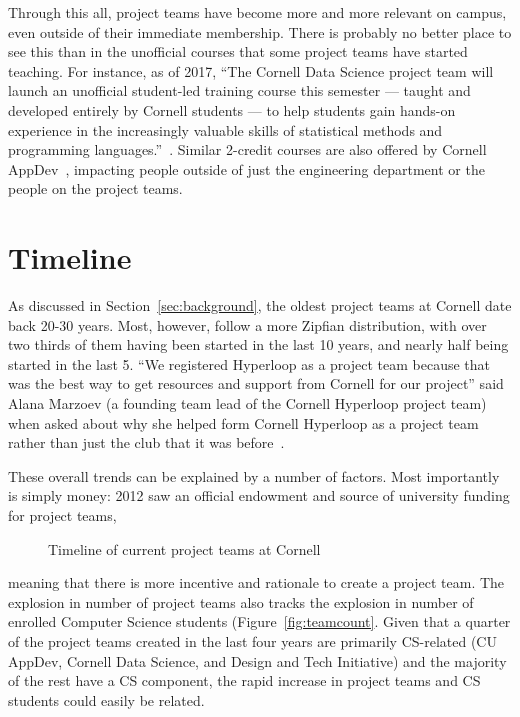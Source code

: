 \documentclass[12pt]{article}
\begin{document}
Through this all, project teams have become more and more relevant on campus, even outside of their immediate membership.
There is probably no better place to see this than in the unofficial courses that some project teams have started teaching.
For instance, as of 2017, ``The Cornell Data Science project team will launch an unofficial student-led training course this semester — taught and developed entirely by Cornell students — to help students gain hands-on experience in the increasingly valuable skills of statistical methods and programming languages.''~\cite{si_cornell_2017}.
Similar 2-credit courses are also offered by Cornell AppDev~\cite{noauthor_cornell_2018-5}, impacting people outside of just the engineering department or the people on the project teams.

\section{Timeline}
\label{sec:timeline}

As discussed in Section~\ref{sec:background}, the oldest project teams at Cornell date back 20-30 years.
Most, however, follow a more Zipfian distribution, with over two thirds of them having been started in the last 10 years, and nearly half being started in the last 5.
``We registered Hyperloop as a project team because that was the best way to get resources and support from Cornell for our project'' said Alana Marzoev (a founding team lead of the Cornell Hyperloop project team) when asked about why she helped form Cornell Hyperloop as a project team rather than just the club that it was before~\cite{marzoev_rationale_2018}.

These overall trends can be explained by a number of factors.
Most importantly is simply money: 2012 saw an official endowment and source of university funding for project teams,

\begin{landscape}
  \begin{figure}
    
    \caption{Timeline of current project teams at Cornell}
    \label{fig:timeline}
  \end{figure}
\end{landscape}

\noindent  meaning that there is more incentive and rationale to create a project team. The explosion in number of project teams also tracks the explosion in number of enrolled Computer Science students (Figure~\ref{fig:teamcount}.
Given that a quarter of the project teams created in the last four years are primarily CS-related (CU AppDev, Cornell Data Science, and Design and Tech Initiative) and the majority of the rest have a CS component, the rapid increase in project teams and CS students could easily be related.
\end{document}
